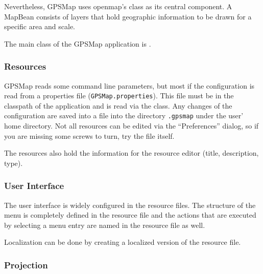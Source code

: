 \documentclass[a4paper]{article} %
\begin{document}
Nevertheless, GPSMap uses openmap's  class as its
central component. A MapBean consists of layers that hold geographic
information to be drawn for a specific area and scale. 

The main class of the GPSMap application is
.

\subsubsection{Resources}
\label{SoftwareDesignOfTheGpstoolPackage-Resources}

GPSMap reads some command line parameters, but most if the
configuration is read from a properties file
(\texttt{GPSMap.properties}). This file must be in the classpath of
the application and is read via the
 class. Any changes of the
configuration are saved into a file into the directory
\texttt{.gpsmap} under the user' home directory. Not all resources can
be edited via the ``Preferences'' dialog, so if you are missing some
screws to turn, try the file itself.

The resources also hold the information for the resource editor
(title, description, type).


\subsubsection{User Interface}
\label{SoftwareDesignOfTheGpstoolPackage-UserInterface}

The user interface is widely configured in the resource files. The
structure of the menu is completely defined in the resource file and
the actions that are executed by selecting a menu entry are named in
the resource file as well.

Localization can be done by creating a localized version of the
resource file.

\subsubsection{Projection}
\label{SoftwareDesignOfTheGpstoolPackage-Projection}
\end{document}
